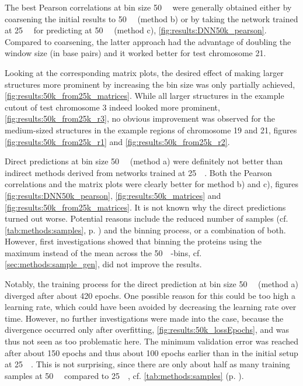 The best Pearson correlations at bin size \SI{50}{\kilo\bp} were generally obtained either by coarsening the initial results to \SI{50}{\kilo\bp} 
(method b) or by taking the network trained at \SI{25}{\kilo\bp} for predicting at \SI{50}{\kilo\bp} (method c), \cref{fig:results:DNN50k_pearson}.
Compared to coarsening, the latter approach had the advantage of doubling the window size (in base pairs) and it worked better for test chromosome 21.

Looking at the corresponding matrix plots, the desired effect of making larger structures more prominent by increasing the bin size was only partially achieved, \cref{fig:results:50k_from25k_matrices}.
While all larger structures in the example cutout of test chromosome 3 indeed looked more prominent, \cref{fig:results:50k_from25k_r3},
no obvious improvement was observed for the medium-sized structures in the example regions of chromosome 19 and 21, 
figures \ref{fig:results:50k_from25k_r1} and \ref{fig:results:50k_from25k_r2}.

Direct predictions at bin size \SI{50}{\kilo\bp} (method a) were definitely not better than indirect methods derived from networks
trained at \SI{25}{\kilo\bp}. 
Both the Pearson correlations and the matrix plots were clearly better for method b) and c),
figures \ref{fig:results:DNN50k_pearson}, \ref{fig:results:50k_matrices} and \ref{fig:results:50k_from25k_matrices}.
It is not known why the direct predictions turned out worse. 
Potential reasons include the reduced number of samples (cf. \cref{tab:methods:samples}, p. \pageref{tab:methods:samples})
and the binning process, or a combination of both.
However, first investigations showed that binning the proteins using the maximum instead of the mean across the \SI{50}{\kilo\bp}-bins, cf. \cref{sec:methods:sample_gen},
did not improve the results.

Notably, the training process for the direct prediction at bin size \SI{50}{\kilo\bp} (method a) diverged after about 420 epochs.
One possible reason for this could be too high a learning rate, which could have been avoided by decreasing the learning rate over time.
However, no further investigations were made into the case, because the divergence occurred only after overfitting, \cref{fig:results:50k_lossEpochs}, and was thus not seen as too problematic here.
The minimum validation error was reached after about 150 epochs and thus about 100 epochs earlier than in the initial setup at \SI{25}{\kilo\bp}. 
This is not surprising, since there are only about half as many training samples at \SI{50}{\kilo\bp} compared to \SI{25}{\kilo\bp}, 
cf. \cref{tab:methods:samples} (p. \pageref{tab:methods:samples}).


